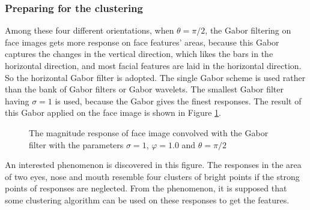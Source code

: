 \subsubsection{Preparing for the clustering}
Among these four different orientations, when $\theta=\pi/2$, the Gabor filtering on face images gets more response on face features’ areas, because this Gabor captures the changes in the vertical direction, which likes the bars in the horizontal direction, and most facial features are laid in the horizontal direction. So the horizontal Gabor filter is adopted. The single Gabor scheme is used rather than the bank of Gabor filters or Gabor wavelets. The smallest Gabor filter having $\sigma=1$ is used, because the Gabor gives the finest responses. The result of this Gabor applied on the face image is shown in \mbox{Figure} \ref{fig:smallestgaborresult}.
\begin{figure}[ht]
 \begin{center}
  \caption{The magnitude response of face image convolved with the Gabor filter with the parameters $\sigma=1$, $\varphi=1.0$ and $\theta=\pi/2$}
  \label{fig:smallestgaborresult}
 \end{center} 
\end{figure}
An interested phenomenon is discovered in this figure. The responses in the area of two eyes, nose and mouth resemble four clusters of bright points if the strong points of responses are neglected. From the phenomenon, it is supposed that some clustering algorithm can be used on these responses to get the features. 

